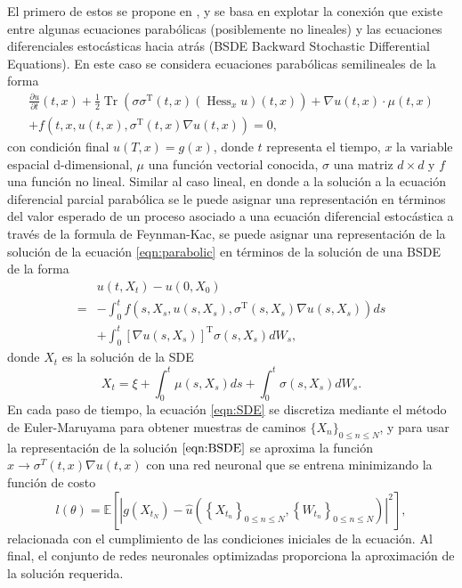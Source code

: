 \documentclass[a4paper,11pt]{scrartcl}
\begin{document}
	El primero de estos se propone en \cite{han_solving_2018}, y se basa en explotar la conexión que existe entre algunas ecuaciones parabólicas (posiblemente no lineales) y las ecuaciones diferenciales estocásticas hacia atrás (BSDE Backward Stochastic Differential Equations)\cite{Revuz1999}. En este caso se considera ecuaciones parabólicas semilineales de la forma
	\begin{equation}
		\label{eqn:parabolic}
		\begin{gathered}
			\frac{\partial u}{\partial t}(t, x)+\frac{1}{2} \operatorname{Tr}\left(\sigma \sigma^{\mathrm{T}}(t, x)\left(\operatorname{Hess}_x u\right)(t, x)\right)+\nabla u(t, x) \cdot \mu(t, x) \\
			+f\left(t, x, u(t, x), \sigma^{\mathrm{T}}(t, x) \nabla u(t, x)\right)=0,
		\end{gathered}
	\end{equation}
	con condición final $u(T,x)=g(x)$, donde $t$ representa el tiempo, $x$ la variable espacial d-dimensional, $\mu $ una función vectorial conocida, $\sigma$ una matriz $d\times d$ y $f$ una función no lineal. Similar al caso lineal, en donde a la solución a la ecuación diferencial parcial parabólica se le puede asignar una representación en términos del valor esperado de un proceso asociado a una ecuación diferencial estocástica a través de la formula de Feynman-Kac, se puede asignar una representación de la solución de la ecuación \ref{eqn:parabolic} en términos de la solución de una BSDE de la forma
	\begin{equation}
		\label{eqn:BSDE}
		\begin{aligned}
			& u\left(t, X_t\right)-u\left(0, X_0\right) \\
			=&-\int_0^t f\left(s, X_s, u\left(s, X_s\right), \sigma^{\mathrm{T}}\left(s, X_s\right) \nabla u\left(s, X_s\right)\right) d s \\
			&+\int_0^t\left[\nabla u\left(s, X_s\right)\right]^{\mathrm{T}} \sigma\left(s, X_s\right) d W_s ,
		\end{aligned}
	\end{equation}
	donde $X_t$ es la solución de la SDE
	\begin{equation}
		\label{eqn:SDE}
		X_t=\xi+\int_0^t \mu\left(s, X_s\right) d s+\int_0^t \sigma\left(s, X_s\right) d W_s.
	\end{equation}
	En cada paso de tiempo, la ecuación \ref{eqn:SDE} se discretiza mediante el método de Euler-Maruyama para obtener muestras de caminos $\{ X_n\}_{0\leq n \leq N}$, y para usar la representación de la solución $\ref{eqn:BSDE}$ se aproxima la función $x\to \sigma^{T}(t,x)\nabla u(t,x)$ con una red neuronal que se entrena minimizando la función de costo
	\begin{equation}
		l(\theta)=\mathbb{E}\left[\left|g\left(X_{t_N}\right)-\hat{u}\left(\left\{X_{t_n}\right\}_{0 \leq n \leq N},\left\{W_{t_n}\right\}_{0 \leq n \leq N}\right)\right|^2\right],
	\end{equation}	
	relacionada con el cumplimiento de las condiciones iniciales de la ecuación. Al final, el conjunto de redes neuronales optimizadas proporciona la aproximación de la solución requerida.\\
	
\end{document}
